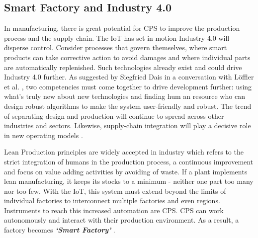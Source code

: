 {\subsection{Smart Factory and Industry 4.0} \label{smartfactory}
In manufacturing, there is great potential for \acs{CPS} to improve the production process and the supply chain. The \acs{IoT} has set in motion Industry 4.0 will disperse control. Consider processes that govern themselves, where smart products can take corrective action to avoid damages and where individual parts are automatically replenished. Such technologies already exist and could drive Industry 4.0 further. As suggested by Siegfried Dais in a conversation with L{\"o}ffler et al. \cite{IOTMANU}, two competencies must come together to drive development further: using what’s truly new about new technologies and finding hum an resource who can design robust algorithms to make the system user-friendly and robust. The trend of separating design and production will continue to spread across other industries and sectors. Likewise, supply-chain integration will play a decisive role in new operating models \cite{IOTMANU}.

Lean Production principles are widely accepted in industry which refers to the strict integration of humans in the production process, a continuous improvement and focus on value adding activities by avoiding of waste. If a plant implements lean manufacturing, it keeps its stocks to a minimum - neither one part too many nor too few. With the \acs{IoT}, this system must extend beyond the limits of individual factories to interconnect multiple factories and even regions. Instruments to reach this increased automation are \acs{CPS}. \acs{CPS} can work autonomously and interact with their production environment. As a result, a factory becomes \textbf{\textit{‘Smart Factory’}} \cite{LEANKOLBERG,IOTMANU}.

}
